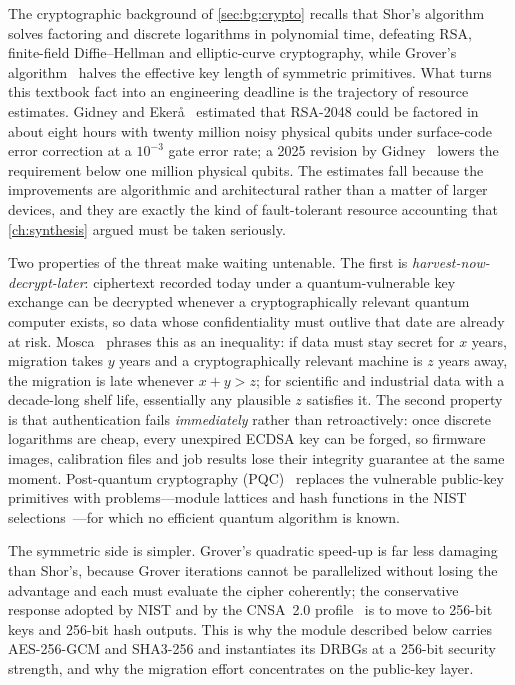 The cryptographic background of \cref{sec:bg:crypto} recalls that Shor's algorithm~\cite{shor1997factoring} solves factoring and discrete logarithms in polynomial time, defeating RSA, finite-field Diffie--Hellman and elliptic-curve cryptography, while Grover's algorithm~\cite{grover1996search} halves the effective key length of symmetric primitives. What turns this textbook fact into an engineering deadline is the trajectory of resource estimates. Gidney and Eker{\aa}~\cite{gidney2021rsa} estimated that RSA-2048 could be factored in about eight hours with twenty million noisy physical qubits under surface-code error correction at a $10^{-3}$ gate error rate; a 2025 revision by Gidney~\cite{gidney2025million} lowers the requirement below one million physical qubits. The estimates fall because the improvements are algorithmic and architectural rather than a matter of larger devices, and they are exactly the kind of fault-tolerant resource accounting that \cref{ch:synthesis} argued must be taken seriously.

Two properties of the threat make waiting untenable. The first is \emph{harvest-now-decrypt-later}: ciphertext recorded today under a quantum-vulnerable key exchange can be decrypted whenever a cryptographically relevant quantum computer exists, so data whose confidentiality must outlive that date are already at risk. Mosca~\cite{mosca2018ready} phrases this as an inequality: if data must stay secret for $x$ years, migration takes $y$ years and a cryptographically relevant machine is $z$ years away, the migration is late whenever $x+y>z$; for scientific and industrial data with a decade-long shelf life, essentially any plausible $z$ satisfies it. The second property is that authentication fails \emph{immediately} rather than retroactively: once discrete logarithms are cheap, every unexpired ECDSA key can be forged, so firmware images, calibration files and job results lose their integrity guarantee at the same moment. Post-quantum cryptography (PQC)~\cite{bernstein2017pqc} replaces the vulnerable public-key primitives with problems---module lattices and hash functions in the NIST selections~\cite{nist2022ir8413}---for which no efficient quantum algorithm is known.

The symmetric side is simpler. Grover's quadratic speed-up is far less damaging than Shor's, because Grover iterations cannot be parallelized without losing the advantage and each must evaluate the cipher coherently; the conservative response adopted by NIST and by the CNSA~2.0 profile~\cite{nsa2022cnsa2} is to move to 256-bit keys and 256-bit hash outputs. This is why the module described below carries AES-256-GCM and SHA3-256 and instantiates its DRBGs at a 256-bit security strength, and why the migration effort concentrates on the public-key layer.

